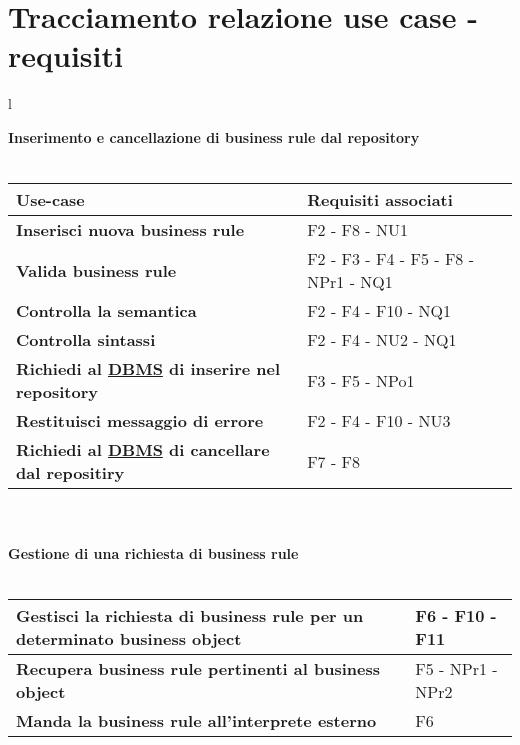 \section{Tracciamento relazione use case - requisiti}
\large{
\begin{tabular}{l}

\textbf{Inserimento e cancellazione di business rule dal repository}\\ \\

\begin{tabular}{||p{8cm}||p{4cm}||} \hline
\textbf{Use-case} & \textbf{Requisiti associati} \\ \hline
\textbf{Inserisci nuova business rule} & F2 - F8 - NU1 \\ \hline
\textbf{Valida business rule} & F2 - F3 - F4 - F5 - F8 - NPr1 - NQ1 \\ \hline
\textbf{Controlla la semantica} & F2 - F4 - F10 - NQ1\\ \hline
\textbf{Controlla sintassi} & F2 - F4 - NU2 - NQ1\\ \hline
\textbf{Richiedi al \underline{DBMS} di inserire nel repository} & F3 -  F5 -  NPo1 \\ \hline
\textbf{Restituisci messaggio di errore} & F2 - F4 - F10 - NU3 \\ \hline
\textbf{Richiedi al \underline{DBMS} di cancellare dal repositiry} & F7 - F8 \\ \hline
\end{tabular} \\ \\

\textbf {Gestione di una richiesta di business rule}\\ \\

\begin{tabular}{||p{8cm}||p{4cm}||} \hline
\textbf{Gestisci la richiesta di business rule per un determinato business object} & F6 - F10 - F11 \\ \hline
\textbf{Recupera business rule pertinenti al business object} & F5 - NPr1 - NPr2 \\ \hline
\textbf{Manda la business rule all'interprete esterno} & F6 \\ \hline
\end{tabular} \\
\end{tabular}
}

